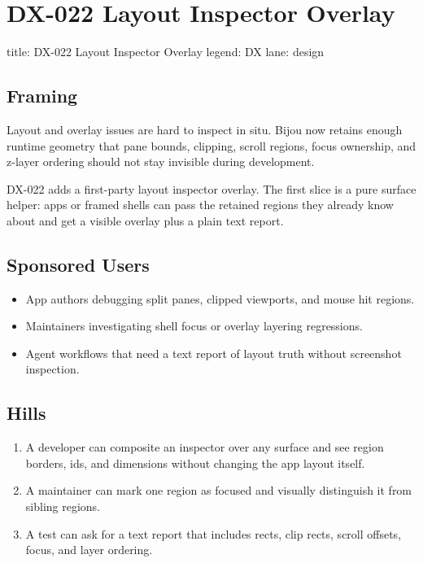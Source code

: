 \chapter{DX-022 Layout Inspector Overlay}\label{record-122}

\smallskip

\begin{RecordMeta}
title: DX-022 Layout Inspector Overlay
legend: DX
lane: design

\end{RecordMeta}

\section{Framing}\label{record-122-framing}

Layout and overlay issues are hard to inspect in situ. Bijou now retains enough runtime geometry that pane bounds, clipping, scroll regions, focus ownership, and z-layer ordering should not stay invisible during development.

DX-022 adds a first-party layout inspector overlay. The first slice is a pure surface helper: apps or framed shells can pass the retained regions they already know about and get a visible overlay plus a plain text report.

\section{Sponsored Users}\label{record-122-sponsored-users}

\begin{itemize}
\tightlist
\item
  App authors debugging split panes, clipped viewports, and mouse hit regions.
\item
  Maintainers investigating shell focus or overlay layering regressions.
\item
  Agent workflows that need a text report of layout truth without screenshot inspection.
\end{itemize}

\section{Hills}\label{record-122-hills}

\begin{enumerate}
\def\labelenumi{\arabic{enumi}.}
\tightlist
\item
  A developer can composite an inspector over any surface and see region borders, ids, and dimensions without changing the app layout itself.
\item
  A maintainer can mark one region as focused and visually distinguish it from sibling regions.
\item
  A test can ask for a text report that includes rects, clip rects, scroll offsets, focus, and layer ordering.
\end{enumerate}

